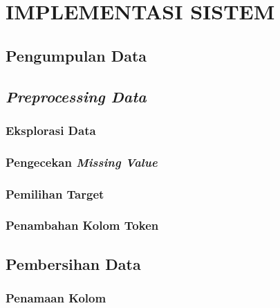 \documentclass[ugmtesis]{ugmtesis}
\begin{document}
\chapter{IMPLEMENTASI SISTEM}
\label{IMPLEMENTASI SISTEM}


	\section{Pengumpulan Data}
	\label{implementasi pengumpulan data}
	

	\section{\textit{Preprocessing Data}}
	\label{implementasi preprocessing data}
	

		\subsection{Eksplorasi Data}
		\label{implementasi eksplorasi data}
		

		\subsection{Pengecekan \textit{Missing Value}}
		\label{implementasi pengecekan missing value}
		
		
		\subsection{Pemilihan Target}
		\label{implementasi pemilihan target}
		

		\subsection{Penambahan Kolom Token}
		\label{implementasi penambahan kolom token}
		

	\section{Pembersihan Data}
	\label{implementasi pembersihan data}
	

		\subsection{Penamaan Kolom}
		\label{implementasi penamaan kolom}
		
\end{document}
